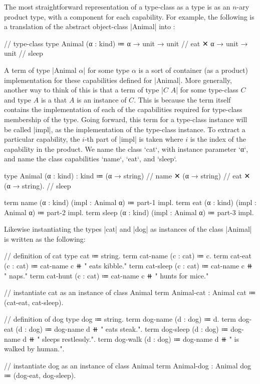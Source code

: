 The most straightforward representation of a type-class as a type is as an $n$-ary product type, with a component for each capability.
For example, the following is a translation of the abstract object-class \code|Animal| into \LangA:
\begin{snippet}
// type-class
type Animal (α : kind)
  ≔ α → unit → unit // eat
  ✕ α → unit → unit // sleep
\end{snippet}
A term of type \code|Animal $α$| for some type $α$ is a sort of container (as a product) implementation for these capabilities defined for \code|Animal|.
More generally, another way to think of this is that a term of type \code|$C$ $A$| for some type-class $C$ and type $A$ is a  that $A$ is an instance of $C$.
This is because the term itself contains the implementation of each of the capabilities required for type-class membership of the type.
Going forward, this term for a type-class instance will be called \code|impl|, as the implementation of the type-class instance.
To extract a particular capability, the $i$-th part of \code|impl| is taken where $i$ is the index of the capability in the product.
We name the class \code`cat`, with instance parameter \code`α`, and name the class capabilities \code`name`, \code`eat`, and \code`sleep`.
\begin{snippet}
type Animal (α : kind) : kind
  ≔ (α → string)  // name
  ✕ (α → string)  // eat
  ✕ (α → string). // sleep

term name  (α : kind) (impl : Animal α) ≔ part-1 impl.
term eat   (α : kind) (impl : Animal α) ≔ part-2 impl.
term sleep (α : kind) (impl : Animal α) ≔ part-3 impl.
\end{snippet}
Likewise instantiating the types \code|cat| and \code|dog| as instances of the class \code|Animal| is written as the following:
\begin{snippet}
// definition of cat
type cat ≔ string.
term cat-name  (c : cat) ≔ c.
term cat-eat   (c : cat) ≔ cat-name c ⧺ " eats kibble."
term cat-sleep (c : cat) ≔ cat-name c ⧺ " naps."
term cat-hunt  (c : cat) ≔ cat-name c ⧺ " hunts for mice."

// instantiate cat as an instance of class Animal
term Animal-cat : Animal cat ≔ (cat-eat, cat-sleep).
\end{snippet}
\begin{snippet}
// definition of dog
type dog ≔ string.
term dog-name  (d : dog) ≔ d.
term dog-eat   (d : dog) ≔ dog-name d ⧺ " eats steak.".
term dog-sleep (d : dog) ≔ dog-name d ⧺ " sleeps restlessly.".
term dog-walk  (d : dog) ≔ dog-name d ⧺ " is walked by human.".

// instantiate dog as an instance of class Animal
term Animal-dog : Animal dog ≔ (dog-eat, dog-sleep).
\end{snippet}

